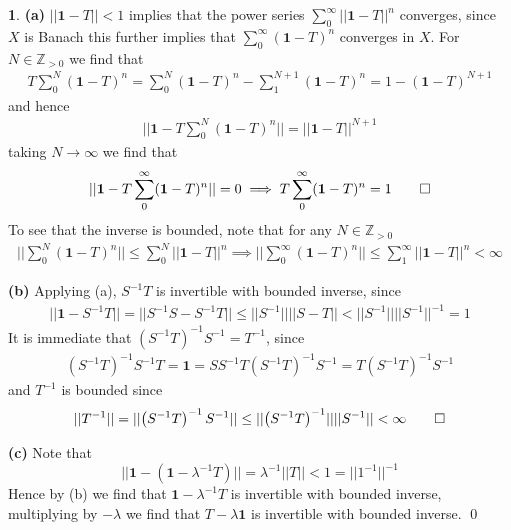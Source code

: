 \documentclass[11pt]{article}
\theoremstyle{definition}
\newtheorem{pb}{}
\newcommand{\norm}[1]{\lvert\lvert#1\rvert\rvert}
\begin{document}
    \begin{pb}
        \textbf{(a)} \(\norm{\mathbf{1} - T} < 1\) implies that the power series \(\sum_0^\infty \norm{\mathbf{1}-T}^n\) converges, since \(X\) is Banach this further implies that \(\sum_0^\infty (\mathbf{1}-T)^n\) converges in \(X\). For \(N \in \mathbb{Z}_{>0}\) we find that
        \begin{align*}
            T\sum_0^N (\mathbf{1}-T)^n = \sum_0^N(\mathbf{1}-T)^n - \sum_1^{N+1}(\mathbf{1}-T)^n = 1 - (\mathbf{1}-T)^{N+1}
        \end{align*}
        and hence
        \begin{align*}
            \norm{\mathbf{1} - T\sum_0^N (\mathbf{1}-T)^n} = \norm{\mathbf{1}-T}^{N+1}
        \end{align*}
        taking \(N \to \infty\) we find that
        \begin{align*}
            \norm{\mathbf{1} - T\sum_0^\infty (\mathbf{1}-T)^n} = 0 \implies T\sum_0^\infty (\mathbf{1}-T)^n = 1 \qed
        \end{align*}
        To see that the inverse is bounded, note that for any \(N \in \mathbb{Z}_{>0}\)
        \begin{align*}
            \norm{\sum_0^N (\mathbf{1}-T)^n} \leq \sum_0^N\norm{\mathbf{1} - T}^n \implies \norm{\sum_0^\infty (\mathbf{1}-T)^n} \leq \sum_1^\infty\norm{\mathbf{1} - T}^n < \infty
        \end{align*}

        \textbf{(b)} Applying (a), \(S^{-1}T\) is invertible with bounded inverse, since
        \begin{align*}
            \norm{\mathbf{1} - S^{-1}T} = \norm{S^{-1}S - S^{-1}T} \leq \norm{S^{-1}}\norm{S - T} < \norm{S^{-1}}\norm{S^{-1}}^{-1} = 1
        \end{align*}
        It is immediate that \(\left(S^{-1}T\right)^{-1}S^{-1} = T^{-1}\), since
        \begin{align*}
            \left(S^{-1}T\right)^{-1}S^{-1}T = \mathbf{1} = SS^{-1}T(S^{-1}T)^{-1}S^{-1} = T(S^{-1}T)^{-1}S^{-1}
        \end{align*}
        and \(T^{-1}\) is bounded since
        \begin{align*}
            \norm{T^{-1}} = \norm{\left(S^{-1}T\right)^{-1}S^{-1}} \leq \norm{\left(S^{-1}T\right)^{-1}}\norm{S^{-1}} < \infty \qed
        \end{align*}

        \textbf{(c)} Note that 
        \[\norm{\mathbf{1} - (\mathbf{1} - \lambda^{-1}T)} = \lambda^{-1}\norm{T} < 1 = \norm{1^{-1}}^{-1}\]
        Hence by (b) we find that \(\mathbf{1} - \lambda^{-1}T\) is invertible with bounded inverse, multiplying by \(-\lambda\) we find that \(T - \lambda\mathbf{1}\) is invertible with bounded inverse. \qed


\end{pb}
\end{document}
